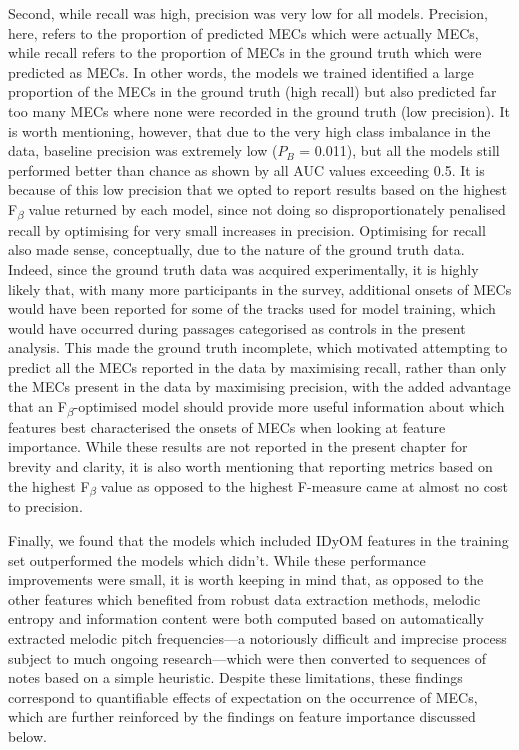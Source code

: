 Second, while recall was high, precision was very low for all models. Precision, here, refers to the proportion of predicted MECs which were actually MECs, while recall refers to the proportion of MECs in the ground truth which were predicted as MECs. In other words, the models we trained identified a large proportion of the MECs in the ground truth (high recall) but also predicted far too many MECs where none were recorded in the ground truth (low precision). It is worth mentioning, however, that due to the very high class imbalance in the data, baseline precision was extremely low ($P_B$ = 0.011), but all the models still performed better than chance as shown by all AUC values exceeding 0.5. It is because of this low precision that we opted to report results based on the highest F\textsubscript{$\beta$} value returned by each model, since not doing so disproportionately penalised recall by optimising for very small increases in precision. Optimising for recall also made sense, conceptually, due to the nature of the ground truth data. Indeed, since the ground truth data was acquired experimentally, it is highly likely that, with many more participants in the survey, additional onsets of MECs would have been reported for some of the tracks used for model training, which would have occurred during passages categorised as controls in the present analysis. This made the ground truth incomplete, which motivated attempting to predict all the MECs reported in the data by maximising recall, rather than only the MECs present in the data by maximising precision, with the added advantage that an F\textsubscript{$\beta$}-optimised model should provide more useful information about which features best characterised the onsets of MECs when looking at feature importance. While these results are not reported in the present chapter for brevity and clarity, it is also worth mentioning that reporting metrics based on the highest F\textsubscript{$\beta$} value as opposed to the highest F-measure came at almost no cost to precision.

Finally, we found that the models which included IDyOM features in the training set outperformed the models which didn't. While these performance improvements were small, it is worth keeping in mind that, as opposed to the other features which benefited from robust data extraction methods, melodic entropy and information content were both computed based on automatically extracted melodic pitch frequencies---a notoriously difficult and imprecise process subject to much ongoing research---which were then converted to sequences of notes based on a simple heuristic. Despite these limitations, these findings correspond to quantifiable effects of expectation on the occurrence of MECs, which are further reinforced by the findings on feature importance discussed below.

